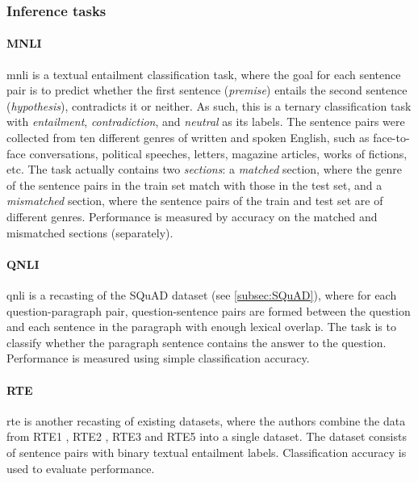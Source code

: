 \subsubsection{Inference tasks}
\label{subsubsec:inference_tasks}
\paragraph{MNLI}
\gls{mnli} \citep{williams2017broad} is a textual entailment classification task, where the goal for each sentence pair is to predict whether the first sentence (\emph{premise}) entails the second sentence (\emph{hypothesis}), contradicts it or neither. As such, this is a ternary classification task with \emph{entailment}, \emph{contradiction}, and \emph{neutral} as its labels. The sentence pairs were collected from ten different genres of written and spoken English, such as face-to-face conversations, political speeches, letters, magazine articles, works of fictions, etc. The task actually contains two \emph{sections}: a \emph{matched} section, where the genre of the sentence pairs in the train set match with those in the test set, and a \emph{mismatched} section, where the sentence pairs of the train and test set are of different genres. Performance is measured by accuracy on the matched and mismatched sections (separately).

\paragraph{QNLI}
\gls{qnli} is a recasting of the SQuAD dataset (see \cref{subsec:SQuAD}), where for each question-paragraph pair, question-sentence pairs are formed between the question and each sentence in the paragraph with enough lexical overlap. The task is to classify whether the paragraph sentence contains the answer to the question. Performance is measured using simple classification accuracy.

\paragraph{RTE}
\gls{rte} is another recasting of existing datasets, where the authors combine the data from RTE1 \citep{dagan2005pascal}, RTE2 \citep{haim2006second}, RTE3 \citep{giampiccolo2007third} and RTE5 \citep{bentivogli2009fifth} into a single dataset. The dataset consists of sentence pairs with binary textual entailment labels. Classification accuracy is used to evaluate performance.

